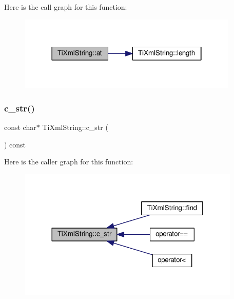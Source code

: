 Here is the call graph for this function\+:\nopagebreak
\begin{figure}[H]
\begin{center}
\leavevmode
\includegraphics[width=298pt]{class_ti_xml_string_a7f33c37f7dfde5193f02521d2a7af1db_cgraph}
\end{center}
\end{figure}
\mbox{\label{class_ti_xml_string_ae2bd36349215612ebcc3cb221c30bd3d}} 
\subsubsection{\texorpdfstring{c\+\_\+str()}{c\_str()}}
{\footnotesize\ttfamily const char$\ast$ Ti\+Xml\+String\+::c\+\_\+str (\begin{DoxyParamCaption}{ }\end{DoxyParamCaption}) const\hspace{0.3cm}{\ttfamily [inline]}}

Here is the caller graph for this function\+:\nopagebreak
\begin{figure}[H]
\begin{center}
\leavevmode
\includegraphics[width=300pt]{class_ti_xml_string_ae2bd36349215612ebcc3cb221c30bd3d_icgraph}
\end{center}
\end{figure}
\mbox{\label{class_ti_xml_string_a0ca248f026e698f79b8aa4c9ab8e1571}} 
